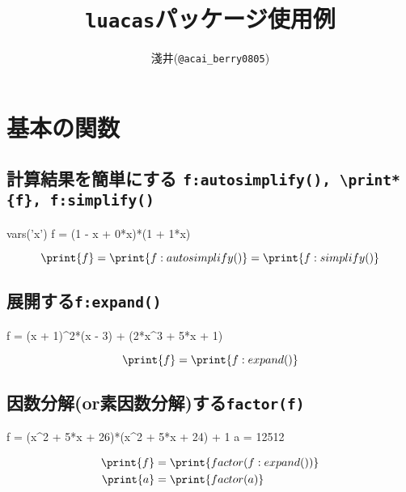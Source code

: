 \documentclass{jlreq}
\begin{document}
\title{\texttt{luacas}パッケージ使用例}
\author{淺井(\texttt{@acai\_berry0805})}
\date{\empty}
\maketitle


\section{基本の関数}


\subsection{
	計算結果を簡単にする
	\quad\texttt{f:autosimplify(), \textbackslash print*\{f\}, f:simplify()}
}
\begin{CAS}
	vars('x') %
	f = (1 - x + 0*x)*(1 + 1*x)
\end{CAS}
\[\print{f}=\print{f:autosimplify()} = \print{f:simplify()}\]


\subsection{展開する\quad\texttt{f:expand()}}
\begin{CAS}
	f = (x + 1)^2*(x - 3) + (2*x^3 + 5*x + 1)
\end{CAS}
\[\print{f}=\print{f:expand()}\]


\subsection{因数分解(or素因数分解)する\quad\texttt{factor(f)}}
\begin{CAS}
	f = (x^2 + 5*x + 26)*(x^2 + 5*x + 24) + 1
	a = 12512
\end{CAS}
\begin{align*}
	\print{f} & =\print{factor(f:expand())} \\
	\print{a} & =\print{factor(a)}
\end{align*}
\end{document}
